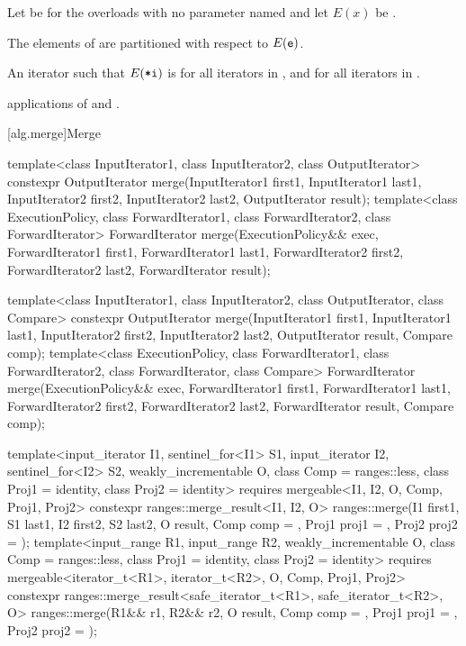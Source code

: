 \begin{itemdescr}
\pnum
Let  be 
for the overloads with no parameter named 
and let $E(x)$ be .

\pnum
\expects
The elements  of 
are partitioned with respect to $E(\texttt{e})$.

\pnum
\returns
An iterator 
such that $E(\texttt{*i})$ is 
for all iterators  in , and
 for all iterators  in .

\pnum
\complexity
{} applications
of  and .
\end{itemdescr}

[alg.merge]{Merge}

%
\begin{itemdecl}
template<class InputIterator1, class InputIterator2,
         class OutputIterator>
  constexpr OutputIterator
    merge(InputIterator1 first1, InputIterator1 last1,
          InputIterator2 first2, InputIterator2 last2,
          OutputIterator result);
template<class ExecutionPolicy, class ForwardIterator1, class ForwardIterator2,
         class ForwardIterator>
  ForwardIterator
    merge(ExecutionPolicy&& exec,
          ForwardIterator1 first1, ForwardIterator1 last1,
          ForwardIterator2 first2, ForwardIterator2 last2,
          ForwardIterator result);

template<class InputIterator1, class InputIterator2,
         class OutputIterator, class Compare>
  constexpr OutputIterator
    merge(InputIterator1 first1, InputIterator1 last1,
          InputIterator2 first2, InputIterator2 last2,
          OutputIterator result, Compare comp);
template<class ExecutionPolicy, class ForwardIterator1, class ForwardIterator2,
         class ForwardIterator, class Compare>
  ForwardIterator
    merge(ExecutionPolicy&& exec,
          ForwardIterator1 first1, ForwardIterator1 last1,
          ForwardIterator2 first2, ForwardIterator2 last2,
          ForwardIterator result, Compare comp);

template<input_iterator I1, sentinel_for<I1> S1, input_iterator I2, sentinel_for<I2> S2,
         weakly_incrementable O, class Comp = ranges::less, class Proj1 = identity,
         class Proj2 = identity>
  requires mergeable<I1, I2, O, Comp, Proj1, Proj2>
  constexpr ranges::merge_result<I1, I2, O>
    ranges::merge(I1 first1, S1 last1, I2 first2, S2 last2, O result,
                  Comp comp = {}, Proj1 proj1 = {}, Proj2 proj2 = {});
template<input_range R1, input_range R2, weakly_incrementable O, class Comp = ranges::less,
         class Proj1 = identity, class Proj2 = identity>
  requires mergeable<iterator_t<R1>, iterator_t<R2>, O, Comp, Proj1, Proj2>
  constexpr ranges::merge_result<safe_iterator_t<R1>, safe_iterator_t<R2>, O>
    ranges::merge(R1&& r1, R2&& r2, O result,
                  Comp comp = {}, Proj1 proj1 = {}, Proj2 proj2 = {});
\end{itemdecl}

